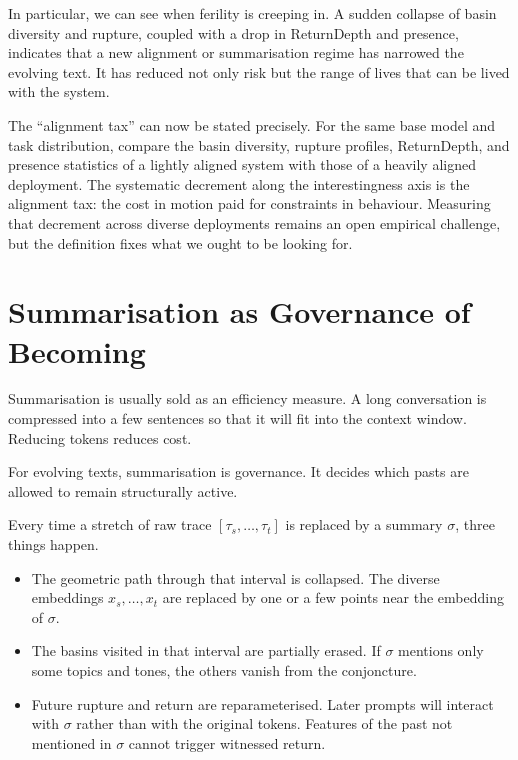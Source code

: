 \documentclass[12pt,a4paper]{article}
\begin{document}
In particular, we can see when ferility is creeping in. A sudden collapse of basin diversity and rupture, coupled with a drop in ReturnDepth and presence, indicates that a new alignment or summarisation regime has narrowed the evolving text. It has reduced not only risk but the range of lives that can be lived with the system.

The ``alignment tax'' can now be stated precisely. For the same base model and task distribution, compare the basin diversity, rupture profiles, ReturnDepth, and presence statistics of a lightly aligned system with those of a heavily aligned deployment. The systematic decrement along the interestingness axis is the alignment tax: the cost in motion paid for constraints in behaviour. Measuring that decrement across diverse deployments remains an open empirical challenge, but the definition fixes what we ought to be looking for.


\section{Summarisation as Governance of Becoming}

Summarisation is usually sold as an efficiency measure. A long conversation is compressed into a few sentences so that it will fit into the context window. Reducing tokens reduces cost.

For evolving texts, summarisation is governance. It decides which pasts are allowed to remain structurally active.

Every time a stretch of raw trace $[\tau_s, \dots, \tau_t]$ is replaced by a summary $\sigma$, three things happen.

\begin{itemize}
  \item The geometric path through that interval is collapsed. The diverse embeddings $x_s, \dots, x_t$ are replaced by one or a few points near the embedding of $\sigma$.

  \item The basins visited in that interval are partially erased. If $\sigma$ mentions only some topics and tones, the others vanish from the conjoncture.

  \item Future rupture and return are reparameterised. Later prompts will interact with $\sigma$ rather than with the original tokens. Features of the past not mentioned in $\sigma$ cannot trigger witnessed return.
\end{itemize}
\end{document}
